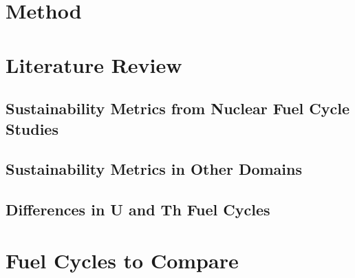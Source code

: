 \documentclass{article}
\begin{document}
\section{Method}



\section{Literature Review}

\subsection{Sustainability Metrics from Nuclear Fuel Cycle Studies}

\subsection{Sustainability Metrics in Other Domains}

\subsection{Differences in U and Th Fuel Cycles}



%

\section{Fuel Cycles to Compare}



\end{document}
